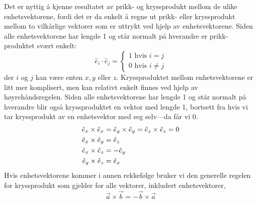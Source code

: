 Det er nyttig å kjenne resultatet av prikk- og kryssprodukt mellom de ulike enhetsvektorene, fordi det er da enkelt å regne ut prikk- eller kryssprodukt mellom to vilkårlige vektorer som er uttrykt ved hjelp av enhetsvektorene. Siden alle enhetsvektorene har lengde 1 og står normalt på hverandre er prikk-produktet svært enkelt:
\begin{displaymath}
	\hat{e}_i \cdot \hat{e}_j = 
	\left\{
		\begin{aligned}
		1 \text{ hvis } i = j \\
		0 \text{ hvis } i\neq j
		\end{aligned}
	\right.
	\label{eq:vektor:prikkprodukt}
\end{displaymath}
der $i$ og $j$ kan være enten $x, y$ eller $z$. Kryssproduktet mellom enhetsvektorene er litt mer komplisert, men kan relativt enkelt finnes ved hjelp av høyrehåndsregelen. Siden alle enhetsvektorene har lengde 1 og står normalt på hverandre blir også kryssproduktet en vektor med lengde 1, bortsett fra hvis vi tar kryssprodukt av en enhetsvektor med seg selv---da får vi 0.
\begin{displaymath}
\begin{aligned}
	\hat{e}_x\times\hat{e}_x &= \hat{e}_y\times\hat{e}_y = \hat{e}_z\times\hat{e}_z = 0 \\
	\hat{e}_x \times \hat{e}_y & = \hat{e}_z \\
	\hat{e}_x \times \hat{e}_z & = -\hat{e}_y \\
	\hat{e}_y \times \hat{e}_z &= \hat{e}_x 
	\label{eq:vektor:kryssprodukt}
\end{aligned}
\end{displaymath}
Hvis enhetsvektorene kommer i annen rekkefølge bruker vi den generelle regelen for kryssprodukt som gjelder for alle vektorer, inkludert enhetsvektorer, 
\begin{displaymath}
	\vec{a}\times\vec{b} = -\vec{b}\times\vec{a}
\end{displaymath}

